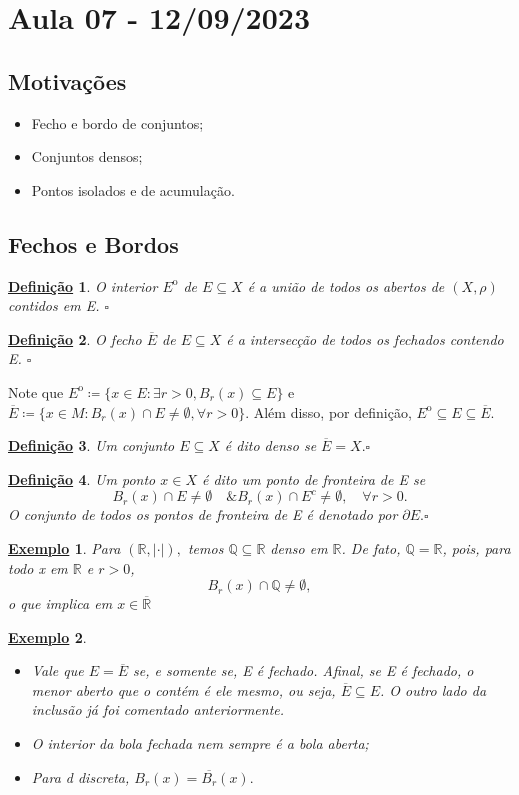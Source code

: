 \documentclass{article}
\newtheorem*{def*}{\underline{Defini\c c\~ao}}
\newtheorem{example}{\underline{Exemplo}}
\begin{document}
\section{Aula 07 - 12/09/2023}
\subsection{Motivações} 
\begin{itemize}
  \item Fecho e bordo de conjuntos;
  \item Conjuntos densos;
  \item Pontos isolados e de acumulação.
\end{itemize}
\subsection{Fechos e Bordos}
 \begin{def*}
   O interior \({E}^{\mathrm{o}}\) de \(E\subseteq{X}\) é a união de todos os abertos de \((X, \rho )\) contidos em E. \(\square\)
 \end{def*}
\begin{def*}
  O fecho \(\overline{E}\) de \(E\subseteq{X}\) é a intersecção de todos os fechados contendo E. \(\square\)
\end{def*}
Note que \({E}^{\mathrm{o}}\coloneqq \{x\in E: \exists r > 0, B_{r}(x)\subseteq{E}\}\) e \(\overline{E}\coloneqq \{x\in M: B_{r}(x)\cap E \neq\emptyset, \forall r>0\}\).
Além disso, por definição, \({E}^{\mathrm{o}}\subseteq{E}\subseteq{\overline{E}}\).
\begin{def*}
  Um conjunto \(E\subseteq{X}\) é dito denso se \(\overline{E}=X.\square\)
\end{def*}
\begin{def*}
  Um ponto \(x\in X\) é dito um ponto de fronteira de E se 
    \[
      B_{r}(x)\cap E \neq\emptyset\quad\& B_{r}(x)\cap E^{c}\neq\emptyset,\quad \forall r>0.
    \]
    O conjunto de todos os pontos de fronteira de E é denotado por \(\partial E.\square\)
\end{def*}
\begin{example}
  Para \((\mathbb{R}, |\cdot |),\) temos \(\mathbb{Q}\subseteq{\mathbb{R}}\) denso em \(\mathbb{R}\).
  De fato, \(\mathbb{Q}=\mathbb{R}\), pois, para todo x em \(\mathbb{R}\) e \(r > 0\), 
    \[
      B_{r}(x)\cap \mathbb{Q}\neq\emptyset,
    \]
    o que implica em \(x\in \overline{\mathbb{R}}\)
\end{example} 
\begin{example}
 \begin{itemize}
   \item[1)] Vale que \(E = \overline{E}\) se, e somente se, E é fechado. Afinal, se E é fechado, o menor aberto
  que o contém é ele mesmo, ou seja, \(\overline{E}\subseteq{E}\). O outro lado da inclusão já foi comentado anteriormente.
   \item[2)] O interior da bola fechada nem sempre é a bola aberta;
   \item[3)] Para d discreta, \(B_{r}(x) = \overline{B_{r}}(x).\)
 \end{itemize}
\end{example}
\end{document}

